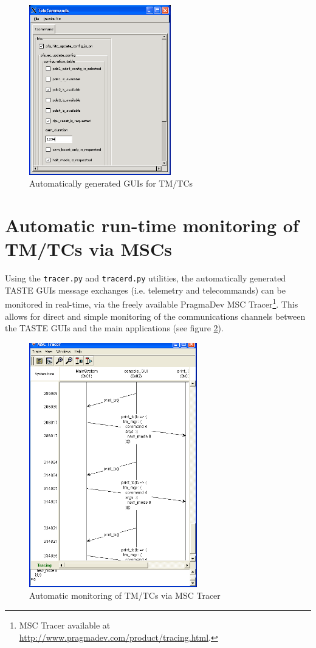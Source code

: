 \documentclass[11pt]{book}
\begin{document}
\begin{figure}
\centering
\includegraphics[width=0.55\textwidth]{imgs/gui1}
\caption{Automatically generated GUIs for TM/TCs}
\label{gui1}
\end{figure}

   \section{Automatic run-time monitoring of TM/TCs via MSCs}
Using the \texttt{tracer.py} and \texttt{tracerd.py} utilities, the automatically generated 
TASTE GUIs message exchanges (i.e. telemetry and telecommands) can be monitored in real-time,
via the freely available PragmaDev MSC Tracer\footnote{MSC Tracer available at \url{http://www.pragmadev.com/product/tracing.html}.}.
This allows for direct and simple monitoring of the communications
channels between the TASTE GUIs and the main applications (see figure \ref{msc}).

\begin{figure}
\centering
\includegraphics[width=0.65\textwidth]{imgs/msc}
\caption{Automatic monitoring of TM/TCs via MSC Tracer}
\label{msc}
\end{figure}
\end{document}
